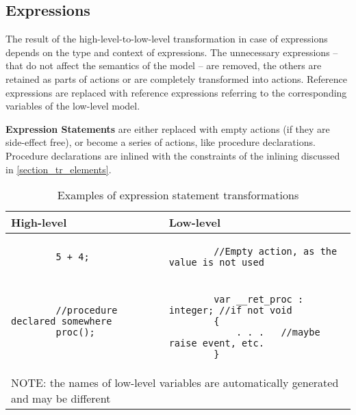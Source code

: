 \subsection{Expressions}
The result of the high-level-to-low-level transformation in case of expressions depends on the type and context of expressions. The unnecessary expressions -- that do not affect the semantics of the model -- are removed, the others are retained as parts of actions or are completely transformed into actions. Reference expressions are replaced with reference expressions referring to the corresponding variables of the low-level model.

\bigskip
\textbf{Expression Statements} are either replaced with empty actions (if they are side-effect free), or become a series of actions, like procedure declarations. Procedure declarations are inlined with the constraints of the inlining discussed in \ref{section_tr_elements}.

\begin{table}[ht]
	\footnotesize
	\centering
	\begin{tabular}{ p{7cm} p{7cm} }
		\toprule
		High-level & Low-level \\
		\midrule
		\begin{lstlisting}
		5 + 4;\end{lstlisting} & 
		\begin{lstlisting}
		//Empty action, as the value is not used\end{lstlisting} \\
		\begin{lstlisting}
		//procedure declared somewhere
		proc();
		
		\end{lstlisting} & 
		\begin{lstlisting}
		var __ret_proc : integer; //if not void
		{
			. . .	//maybe raise event, etc.
		}\end{lstlisting} \\
		\bottomrule
		\multicolumn{2}{l}{NOTE: the names of low-level variables are automatically generated and may be different}
	\end{tabular}
	\caption{Examples of expression statement transformations}
	\label{tab:SCLLExpressionStatementExample}
\end{table}

